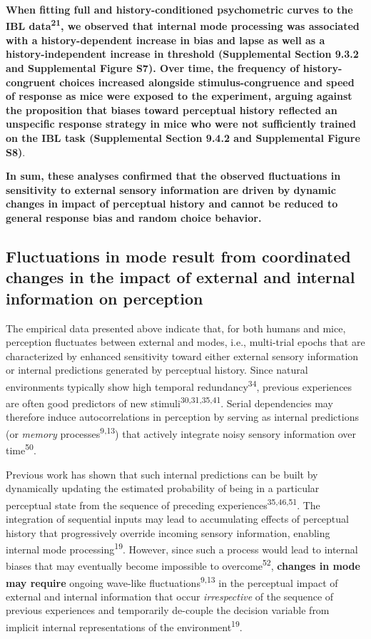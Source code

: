 \documentclass[
]{article}
\begin{document}
\textbf{When fitting full and history-conditioned psychometric curves to
the IBL data\textsuperscript{21}, we observed that internal mode
processing was associated with a history-dependent increase in bias and
lapse as well as a history-independent increase in threshold
(Supplemental Section 9.3.2 and Supplemental Figure S7). Over time, the
frequency of history-congruent choices increased alongside
stimulus-congruence and speed of response as mice were exposed to the
experiment, arguing against the proposition that biases toward
perceptual history reflected an unspecific response strategy in mice who
were not sufficiently trained on the IBL task (Supplemental Section
9.4.2 and Supplemental Figure S8)}.

\textbf{In sum, these analyses confirmed that the observed fluctuations
in sensitivity to external sensory information are driven by dynamic
changes in impact of perceptual history and cannot be reduced to general
response bias and random choice behavior.}

\hypertarget{fluctuations-in-mode-result-from-coordinated-changes-in-the-impact-of-external-and-internal-information-on-perception}{%
\subsection{Fluctuations in mode result from coordinated changes in the
impact of external and internal information on
perception}\label{fluctuations-in-mode-result-from-coordinated-changes-in-the-impact-of-external-and-internal-information-on-perception}}

The empirical data presented above indicate that, for both humans and
mice, perception fluctuates between external and modes, i.e.,
multi-trial epochs that are characterized by enhanced sensitivity toward
either external sensory information or internal predictions generated by
perceptual history. Since natural environments typically show high
temporal redundancy\textsuperscript{34}, previous experiences are often
good predictors of new stimuli\textsuperscript{30,31,35,41}. Serial
dependencies may therefore induce autocorrelations in perception by
serving as internal predictions (or \emph{memory}
processes\textsuperscript{9,13}) that actively integrate noisy sensory
information over time\textsuperscript{50}.

Previous work has shown that such internal predictions can be built by
dynamically updating the estimated probability of being in a particular
perceptual state from the sequence of preceding
experiences\textsuperscript{35,46,51}. The integration of sequential
inputs may lead to accumulating effects of perceptual history that
progressively override incoming sensory information, enabling internal
mode processing\textsuperscript{19}. However, since such a process would
lead to internal biases that may eventually become impossible to
overcome\textsuperscript{52}, \textbf{changes in mode may require}
ongoing wave-like fluctuations\textsuperscript{9,13} in the perceptual
impact of external and internal information that occur
\emph{irrespective} of the sequence of previous experiences and
temporarily de-couple the decision variable from implicit internal
representations of the environment\textsuperscript{19}.
\end{document}
